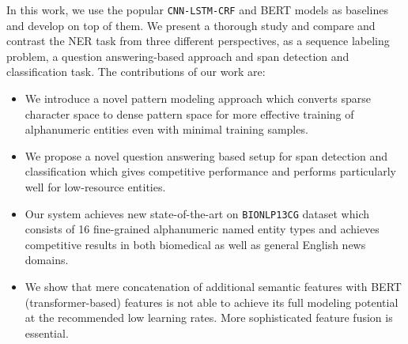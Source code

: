     

In this work, we use the popular \texttt{CNN-LSTM-CRF} and BERT models as baselines and develop on top of them. We present a thorough study and compare and contrast the NER task from three different perspectives, as a sequence labeling problem, a question answering-based approach and span detection and classification task. The contributions of our work are:

\begin{itemize}
    \item We introduce a novel pattern modeling approach which converts sparse character space to dense pattern space for more effective training of alphanumeric entities even with minimal training samples.
    
    \item We propose a novel question answering based setup for span detection and classification which gives competitive performance and performs particularly well for low-resource entities.
    
    \item Our system achieves new state-of-the-art on \texttt{BIONLP13CG} dataset which consists of 16 fine-grained alphanumeric named entity types and achieves competitive results in both biomedical as well as general English news domains.
    
    \item We show that mere concatenation of additional semantic features with BERT (transformer-based) features is not able to achieve its full modeling potential at the recommended low learning rates. More sophisticated feature fusion is essential.
\end{itemize}

